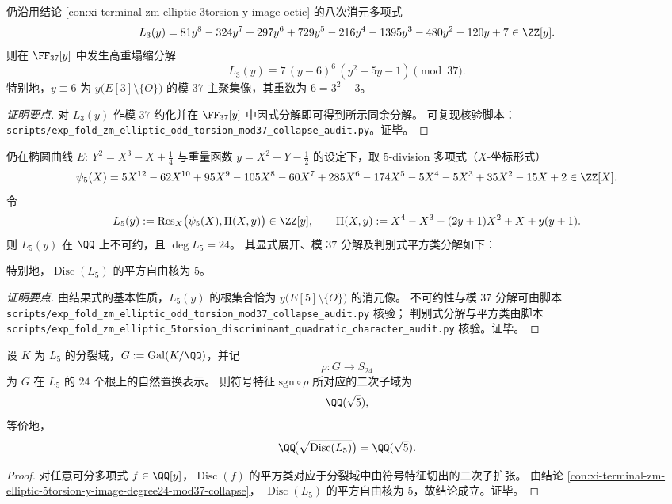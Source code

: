 \begin{conclusion}\label{con:xi-terminal-zm-elliptic-3torsion-y-image-mod37-collapse}
仍沿用结论 \ref{con:xi-terminal-zm-elliptic-3torsion-y-image-octic} 的八次消元多项式
\[
L_{3}(y)=81 y^{8}-324 y^{7}+297 y^{6}+729 y^{5}-216 y^{4}-1395 y^{3}-480 y^{2}-120 y+7\in\ZZ[y].
\]
则在 \(\FF_{37}[y]\) 中发生高重塌缩分解
\[
L_{3}(y)\equiv 7\,(y-6)^{6}\,(y^{2}-5y-1)\pmod{37}.
\]
特别地，\(y\equiv 6\) 为 \(y\bigl(E[3]\setminus\{O\}\bigr)\) 的模 \(37\) 主聚集像，其重数为 \(6=3^{2}-3\)。
\end{conclusion}
\begin{proof}[证明要点]
对 \(L_{3}(y)\) 作模 \(37\) 约化并在 \(\FF_{37}[y]\) 中因式分解即可得到所示同余分解。
可复现核验脚本：\texttt{scripts/exp\_fold\_zm\_elliptic\_odd\_torsion\_mod37\_collapse\_audit.py}。证毕。
\end{proof}

\begin{conclusion}\label{con:xi-terminal-zm-elliptic-5torsion-y-image-degree24-mod37-collapse}
仍在椭圆曲线
\(
E:\ Y^{2}=X^{3}-X+\tfrac14
\)
与重量函数
\(
y=X^{2}+Y-\tfrac12
\)
的设定下，取 \(5\)-division 多项式（\(X\)-坐标形式）
\[
\psi_{5}(X)=5X^{12}-62X^{10}+95X^{9}-105X^{8}-60X^{7}+285X^{6}-174X^{5}-5X^{4}-5X^{3}+35X^{2}-15X+2\in\ZZ[X].
\]
令
\[
L_{5}(y):=\operatorname{Res}_{X}\bigl(\psi_{5}(X),\Pi(X,y)\bigr)\in\ZZ[y],
\qquad
\Pi(X,y):=X^{4}-X^{3}-(2y+1)X^{2}+X+y(y+1).
\]
则 \(L_{5}(y)\) 在 \(\QQ\) 上不可约，且 \(\deg L_{5}=24\)。
其显式展开、模 \(37\) 分解及判别式平方类分解如下：

特别地，\(\operatorname{Disc}(L_5)\) 的平方自由核为 \(5\)。
\end{conclusion}
\begin{proof}[证明要点]
由结果式的基本性质，\(L_{5}(y)\) 的根集合恰为 \(y\bigl(E[5]\setminus\{O\}\bigr)\) 的消元像。
不可约性与模 \(37\) 分解可由脚本 \texttt{scripts/exp\_fold\_zm\_elliptic\_odd\_torsion\_mod37\_collapse\_audit.py} 核验；
判别式分解与平方类由脚本 \texttt{scripts/exp\_fold\_zm\_elliptic\_5torsion\_discriminant\_quadratic\_character\_audit.py} 核验。证毕。
\end{proof}

\begin{corollary}[五次权除法分裂域的符号二次特征]\label{cor:xi-terminal-zm-elliptic-5torsion-sign-quadratic-field}
设 \(K\) 为 \(L_{5}\) 的分裂域，\(G:=\mathrm{Gal}(K/\QQ)\)，并记
\[
\rho:G\longrightarrow S_{24}
\]
为 \(G\) 在 \(L_{5}\) 的 \(24\) 个根上的自然置换表示。
则符号特征 \(\mathrm{sgn}\circ\rho\) 所对应的二次子域为
\[
\QQ(\sqrt5),
\]
等价地，
\[
\QQ\!\bigl(\sqrt{\operatorname{Disc}(L_{5})}\bigr)=\QQ(\sqrt5).
\]
\end{corollary}
\begin{proof}
对任意可分多项式 \(f\in\QQ[y]\)，\(\operatorname{Disc}(f)\) 的平方类对应于分裂域中由符号特征切出的二次子扩张。
由结论 \ref{con:xi-terminal-zm-elliptic-5torsion-y-image-degree24-mod37-collapse}，
\(\operatorname{Disc}(L_{5})\) 的平方自由核为 \(5\)，故结论成立。证毕。
\end{proof}

